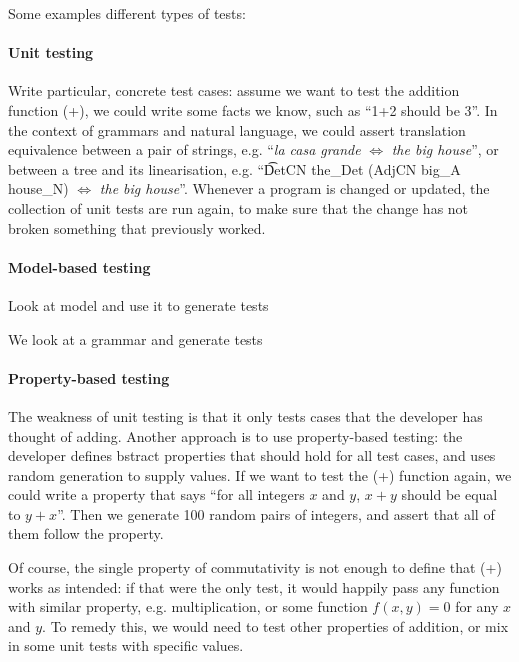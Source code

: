 Some examples different types of tests:

\paragraph{Unit testing}

Write particular, concrete test cases: assume we want to test the
addition function (+), we could write some facts we know, such as
``1+2 should be 3''. In the context of grammars and natural language,
we could assert translation equivalence between a pair of strings,
e.g. ``\emph{la casa grande} $\Leftrightarrow$ \emph{the big house}'',
or between a tree and its linearisation, e.g. ``\t{DetCN the\_Det
  (AdjCN  big\_A house\_N)} $\Leftrightarrow$ \emph{the big house}''.
Whenever a program is changed or updated, the collection of unit tests
are run again, to make sure that the change has not broken something
that previously worked.

\paragraph{Model-based testing}

Look at model and use it to generate tests

We look at a grammar and generate tests

\paragraph{Property-based testing}

The weakness of unit testing is that it only tests cases that the
developer has thought of adding. Another approach is to use
property-based testing: the developer defines bstract properties that
should hold for all test cases, and uses random generation to supply
values. If we want to test the (+) function again, we could write a
property that says ``for all integers $x$ and $y$, $x+y$ should be
equal to $y+x$''. Then we generate 100 random pairs of integers, and
assert that all of them follow the property. 

Of course, the single property of commutativity is not enough to
define that (+) works as intended: if that were the only test, it
would happily pass any function with similar property,
e.g. multiplication, or some function $f(x, y) = 0$ for any $x$
and $y$. To remedy this, we would need to test other properties of
addition, or mix in some unit tests with specific values.



